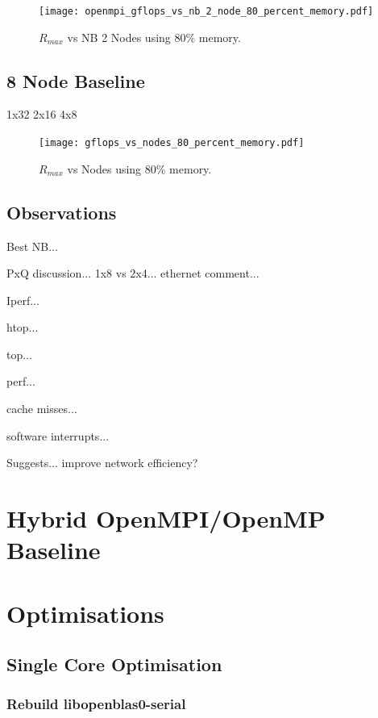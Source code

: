 \documentclass{report}
\begin{document}
\begin{figure}
	\centering	
	\texttt{[image: openmpi\_gflops\_vs\_nb\_2\_node\_80\_percent\_memory.pdf]}
	\caption{$R_{max}$ vs NB 2 Nodes using 80\% memory.}
\end{figure}


\subsection{8 Node Baseline}

1x32
2x16
4x8

\begin{figure}
	\centering	
	\texttt{[image: gflops\_vs\_nodes\_80\_percent\_memory.pdf]}
	\caption{$R_{max}$ vs Nodes using 80\% memory.}
\end{figure}



\subsection{Observations}

Best NB...

PxQ discussion... 1x8 vs 2x4... ethernet comment...

Iperf...

htop...

top...

perf...

cache misses...

software interrupts...

Suggests... improve network efficiency?


%
%
\section{Hybrid OpenMPI/OpenMP Baseline}






%
%
\section{Optimisations}


%
%
\subsection{Single Core Optimisation}


%
%
\subsubsection{Rebuild libopenblas0-serial}
\end{document}
